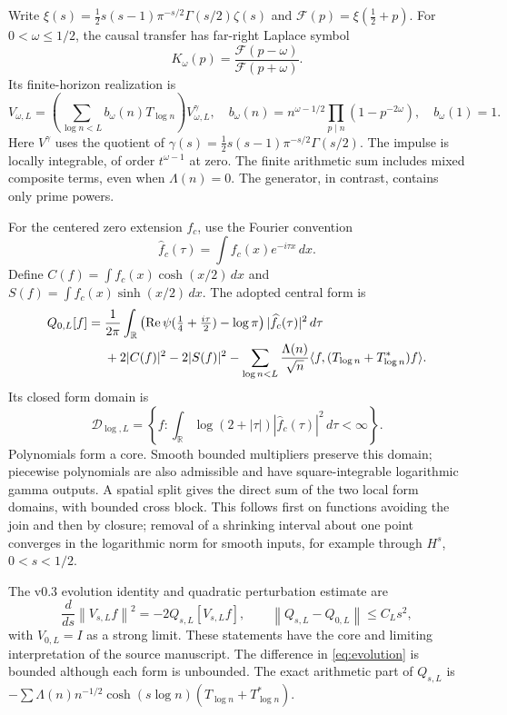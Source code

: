 \documentclass[11pt]{article}
\theoremstyle{remark}\newtheorem{remark}[theorem]{Remark}
\newcommand{\DD}{\mathcal D}
\newcommand{\Rea}{\operatorname{Re}}
\newcommand{\norm}[1]{\left\|#1\right\|}
\newcommand{\ip}[2]{\langle #1,#2\rangle}
\begin{document}
Write $\xi(s)=\tfrac12s(s-1)\pi^{-s/2}\Gamma(s/2)\zeta(s)$ and $\mathscr F(p)=\xi(\tfrac12+p)$. For $0<\omega\le1/2$, the causal transfer has far-right Laplace symbol
\begin{equation}\label{eq:K}
 K_\omega(p)=\frac{\mathscr F(p-\omega)}{\mathscr F(p+\omega)}.
\end{equation}
Its finite-horizon realization is
\[
 V_{\omega,L}=\left(\sum_{\log n<L}b_\omega(n)T_{\log n}\right)V^\gamma_{\omega,L},
 \quad b_\omega(n)=n^{\omega-1/2}\prod_{p\mid n}(1-p^{-2\omega}),\quad b_\omega(1)=1.
\]
Here $V^\gamma$ uses the quotient of $\gamma(s)=\tfrac12s(s-1)\pi^{-s/2}\Gamma(s/2)$. The impulse is locally integrable, of order $t^{\omega-1}$ at zero. The finite arithmetic sum includes mixed composite terms, even when $\Lambda(n)=0$. The generator, in contrast, contains only prime powers.

For the centered zero extension $f_c$, use the Fourier convention
\[
 \widehat f_c(\tau)=\int f_c(x)e^{-i\tau x}\,dx.
\]
Define $C(f)=\int f_c(x)\cosh(x/2)\,dx$ and
$S(f)=\int f_c(x)\sinh(x/2)\,dx$. The adopted central form is
\begin{align}\label{eq:Q}
 Q_{0,L}[f]={}&\frac1{2\pi}\int_{\mathbb R}
 \left(\Rea\psi(\tfrac14+\tfrac{i\tau}{2})-\log\pi\right)|\widehat f_c(\tau)|^2\,d\tau\notag\\
 &+2|C(f)|^2-2|S(f)|^2
 -\sum_{\log n<L}\frac{\Lambda(n)}{\sqrt n}\ip f{(T_{\log n}+T_{\log n}^*)f}.
\end{align}
Its closed form domain is
\[
 \DD_{\log,L}=\left\{f:\int_{\mathbb R}\log(2+|\tau|)|\widehat f_c(\tau)|^2\,d\tau<\infty\right\}.
\]
Polynomials form a core. Smooth bounded multipliers preserve this domain; piecewise polynomials are also admissible and have square-integrable logarithmic gamma outputs. A spatial split gives the direct sum of the two local form domains, with bounded cross block. This follows first on functions avoiding the join and then by closure; removal of a shrinking interval about one point converges in the logarithmic norm for smooth inputs, for example through $H^s$, $0<s<1/2$.

The v0.3 evolution identity and quadratic perturbation estimate are
\begin{equation}\label{eq:evolution}
 \frac{d}{ds}\norm{V_{s,L}f}^2=-2Q_{s,L}[V_{s,L}f],\qquad
 \norm{Q_{s,L}-Q_{0,L}}\le C_Ls^2,
\end{equation}
with $V_{0,L}=I$ as a strong limit. These statements have the core and limiting interpretation of the source manuscript. The difference in \eqref{eq:evolution} is bounded although each form is unbounded. The exact arithmetic part of $Q_{s,L}$ is
$-\sum\Lambda(n)n^{-1/2}\cosh(s\log n)(T_{\log n}+T_{\log n}^*)$.
\end{document}

